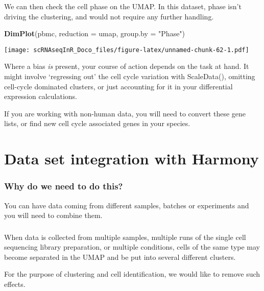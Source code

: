 \documentclass[
]{book}
\newenvironment{Shaded}{\begin{snugshade}}{\end{snugshade}}
\newcommand{\AttributeTok}[1]{\textcolor[rgb]{0.13,0.29,0.53}{#1}}
\newcommand{\FunctionTok}[1]{\textcolor[rgb]{0.13,0.29,0.53}{\textbf{#1}}}
\newcommand{\NormalTok}[1]{#1}
\newcommand{\StringTok}[1]{\textcolor[rgb]{0.31,0.60,0.02}{#1}}
\begin{document}
We can then check the cell phase on the UMAP. In this dataset, phase isn't driving the clustering, and would not require any further handling.

\begin{Shaded}
\begin{Highlighting}[]
\FunctionTok{DimPlot}\NormalTok{(pbmc, }\AttributeTok{reduction =} \StringTok{\textquotesingle{}umap\textquotesingle{}}\NormalTok{, }\AttributeTok{group.by =} \StringTok{"Phase"}\NormalTok{)}
\end{Highlighting}
\end{Shaded}

\texttt{[image: scRNAseqInR\_Doco\_files/figure-latex/unnamed-chunk-62-1.pdf]}

Where a bias \emph{is} present, your course of action depends on the task at hand. It might involve `regressing out' the cell cycle variation with ScaleData(), omitting cell-cycle dominated clusters, or just accounting for it in your differential expression calculations.

If you are working with non-human data, you will need to convert these gene lists, or find new cell cycle associated genes in your species.

\hypertarget{Harmony}{%
\chapter{Data set integration with Harmony}\label{Harmony}}

\hypertarget{why-do-we-need-to-do-this-2}{%
\subsection{Why do we need to do this?}\label{why-do-we-need-to-do-this-2}}

You can have data coming from different samples, batches or experiments and you will need to combine them.

\hypertarget{section-2}{%
\subsection{}\label{section-2}}

When data is collected from multiple samples, multiple runs of the single cell sequencing library preparation, or multiple conditions, cells of the same type may become separated in the UMAP and be put into several different clusters.

For the purpose of clustering and cell identification, we would like to remove such effects.
\end{document}
